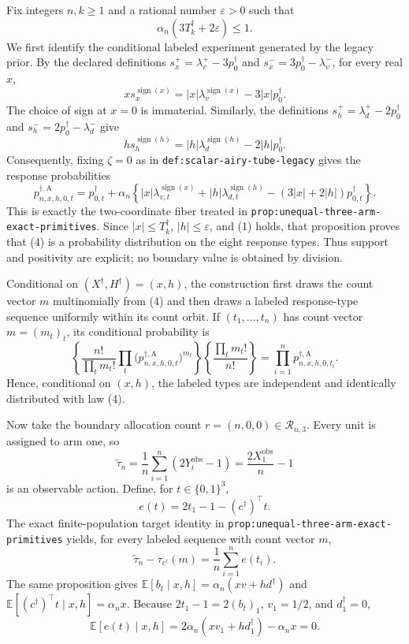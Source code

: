 Fix integers \(n,k\geq 1\) and a rational number \(\varepsilon>0\) such that
\[
\alpha_n(3T_k^\dagger+2\varepsilon)\leq 1.
\tag{1}
\]
We first identify the conditional labeled experiment generated by the legacy prior.  By the declared definitions
\(s_x^+=\lambda_v^+-3p_0^\dagger\) and
\(s_x^-=3p_0^\dagger-\lambda_v^-\), for every real \(x\),
\[
x s_x^{\operatorname{sign}(x)}
=|x|\lambda_v^{\operatorname{sign}(x)}-3|x|p_0^\dagger.
\tag{2}
\]
The choice of sign at \(x=0\) is immaterial.  Similarly, the definitions
\(s_h^+=\lambda_d^+-2p_0^\dagger\) and
\(s_h^-=2p_0^\dagger-\lambda_d^-\) give
\[
h s_h^{\operatorname{sign}(h)}
=|h|\lambda_d^{\operatorname{sign}(h)}-2|h|p_0^\dagger.
\tag{3}
\]
Consequently, fixing \(\zeta=0\) as in
\texttt{def:scalar-airy-tube-legacy} gives the response probabilities
\[
p_{n,x,h,0,t}^{\dagger,\mathrm A}
=p_{0,t}^\dagger+
\alpha_n\left\{|x|\lambda_{v,t}^{\operatorname{sign}(x)}
+|h|\lambda_{d,t}^{\operatorname{sign}(h)}
-(3|x|+2|h|)p_{0,t}^\dagger\right\}.
\tag{4}
\]
This is exactly the two-coordinate fiber treated in
\texttt{prop:unequal-three-arm-exact-primitives}.  Since
\(|x|\leq T_k^\dagger\), \(|h|\leq\varepsilon\), and (1) holds, that proposition proves that (4) is a probability distribution on the eight response types.  Thus support and positivity are explicit; no boundary value is obtained by division.

Conditional on \((X^\dagger,H^\dagger)=(x,h)\), the construction first draws the count vector \(m\) multinomially from (4) and then draws a labeled response-type sequence uniformly within its count orbit.  If \((t_1,\ldots,t_n)\) has count vector \(m=(m_t)_t\), its conditional probability is
\[
\left\{\frac{n!}{\prod_t m_t!}
\prod_t\bigl(p_{n,x,h,0,t}^{\dagger,\mathrm A}\bigr)^{m_t}\right\}
\left\{\frac{\prod_t m_t!}{n!}\right\}
=\prod_{i=1}^n p_{n,x,h,0,t_i}^{\dagger,\mathrm A}.
\tag{5}
\]
Hence, conditional on \((x,h)\), the labeled types are independent and identically distributed with law (4).

Now take the boundary allocation count \(r=(n,0,0)\in\mathcal R_{n,3}\).  Every unit is assigned to arm one, so
\[
\widetilde\tau_n
=\frac1n\sum_{i=1}^n(2Y_i^{\mathrm{obs}}-1)
=\frac{2X_1^{\mathrm{obs}}}{n}-1
\tag{6}
\]
is an observable action.  Define, for \(t\in\{0,1\}^3\),
\[
e(t)=2t_1-1-(c^\dagger)^\top t.
\tag{7}
\]
The exact finite-population target identity in
\texttt{prop:unequal-three-arm-exact-primitives} yields, for every labeled sequence with count vector \(m\),
\[
\widetilde\tau_n-\tau_{c^\dagger}(m)
=\frac1n\sum_{i=1}^n e(t_i).
\tag{8}
\]
The same proposition gives
\(\mathbb E[b_t\mid x,h]=\alpha_n(xv+hd^\dagger)\) and
\(\mathbb E[(c^\dagger)^\top t\mid x,h]=\alpha_nx\).  Because
\(2t_1-1=2(b_t)_1\), \(v_1=1/2\), and \(d_1^\dagger=0\),
\[
\mathbb E[e(t)\mid x,h]
=2\alpha_n(xv_1+hd_1^\dagger)-\alpha_nx=0.
\tag{9}
\]

